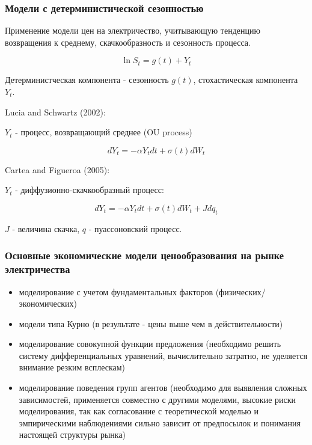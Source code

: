 \documentclass[c, dvipsnames]{beamer}  %
\begin{document}
\begin{frame}[shrink=5]
\frametitle{Модели с детерминистической сезонностью} 

Применение  модели цен на электричество,  учитывающую тенденцию возвращения к среднему, скачкообразность и сезонность процесса.


$$\ln S_t = g(t) +Y_t$$

Детерминистческая компонента - сезонность $g(t)$, стохастическая компонента $Y_t$.


\begin{block}{Lucia and Schwartz (2002): }
	
	$Y_t$ - процесс, возвращающий среднее (OU process)
	
	$$dY_t = -\alpha Y_t dt + \sigma(t) dW_t$$
	
	
	
	
\end{block}



\begin{block}{Cartea and Figueroa (2005): }
	
	
	$Y_t$ - диффузионно-скачкообразный процесс:
	
	$$dY_t = -\alpha Y_t dt + \sigma(t) dW_t + J dq_t$$
	
	$J$ - величина скачка, $q$ - пуассоновский процесс.
	
	
	
	
\end{block}




\end{frame}









\begin{frame}[shrink=5]
\frametitle{Основные экономические модели ценообразования на рынке электричества} 


\begin{itemize}
	\item  моделирование с учетом фундаментальных факторов (физических/экономических)
	\item модели типа Курно (в результате - цены выше чем в действительности)
	\item моделирование совокупной функции предложения (необходимо решить систему дифференциальных уравнений, вычислительно затратно, не уделяется внимание резким всплескам) 
	\item  моделирование поведения групп агентов  (необходимо для выявления сложных зависимостей, применяется совместно с другими моделями, высокие риски моделирования, так как согласование с теоретической моделью  и эмпирическими наблюдениями сильно зависит от предпосылок и понимания настоящей структуры рынка)
	
\end{itemize}

\end{frame}
\end{document}
